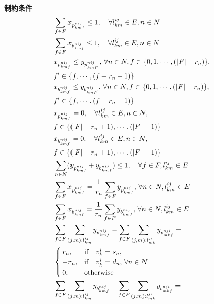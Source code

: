 \documentclass[a4j,twocolumn,fleqn]{jarticle}
\begin{document}
\\
{\large \bf 制約条件}
\begin{eqnarray}
	& \displaystyle \sum_{f \in F}x_{p^{nij}_{kmf}} \leq 1,\quad \forall l^{ij}_{km} \in E,n \in N\\%
	& \displaystyle \sum_{f \in F}x_{b^{nij}_{kmf}} \leq 1,\quad \forall l^{ij}_{km} \in E,n \in N\\%
	& \displaystyle x_{p^{nij}_{kmf}} \leq y_{p^{nij}_{kmf'}},\, \forall n \in N,f \in \{0,1, \cdots ,(|F| - r_n)\}, \nonumber \\
	&f' \in \{f, \cdots ,(f + r_n -1)\}\\%
	& \displaystyle x_{b^{nij}_{kmf}} \leq y_{b^{nij}_{kmf'}},\, \forall n \in N,f \in \{0,1, \cdots ,(|F| - r_n)\}, \nonumber \\
	&f' \in \{f, \cdots ,(f + r_n -1)\}\\%
	&\displaystyle x_{p^{nij}_{kmf}}=0,\quad \forall l^{ij}_{km}\in E,n \in N,\nonumber \\
	&f \in \{(|F|-r_n +1),\cdots,(|F|-1)\}\\%
	&\displaystyle x_{b^{nij}_{kmf}}=0,\quad\forall l^{ij}_{km}\in E,n \in N,\nonumber \\
	&f \in \{(|F|-r_n +1),\cdots,(|F|-1)\}\\%
	&\displaystyle \sum_{n \in N}(y_{p^{nij}_{kmf}} + y_{b^{nij}_{kmf}}) \leq 1,\quad \forall f \in F, l^{ij}_{km}\in E\\%
	&\displaystyle \sum_{f \in F}x_{p^{nij}_{kmf}} = \frac{1}{r_n} \sum_{f \in F}y_{p^{nij}_{kmf}},\, \forall n \in N, l^{ij}_{km} \in E\\%
	&\displaystyle \sum_{f \in F}x_{b^{nij}_{kmf}} = \frac{1}{r_n} \sum_{f \in F}y_{b^{nij}_{kmf}},\, \forall n \in N, l^{ij}_{km} \in E\\%
	&\displaystyle \sum_{f \in F}\sum_{(j,m):l^{ij}_{km}}y_{p^{nij}_{kmf}} - \sum_{f \in F}\sum_{(j,m):l^{ji}_{mk}}y_{p^{nji}_{mkf}} = \nonumber \\
	&\begin{cases}
	r_n,&{\rm if}\quad v^i_k = s_n,\\
	-r_n,&{\rm if}\quad v^i_k = d_n,\, \forall n\in N\\ %
	0,&{\rm otherwise}\\
	\end{cases}\\
	&\displaystyle \sum_{f \in F}\sum_{(j,m):l^{ij}_{km}}y_{b^{nij}_{kmf}} - \sum_{f \in F}\sum_{(j,m):l^{ji}_{mk}}y_{b^{nji}_{mkf}} = \nonumber \\

\end{eqnarray}
\end{document}
